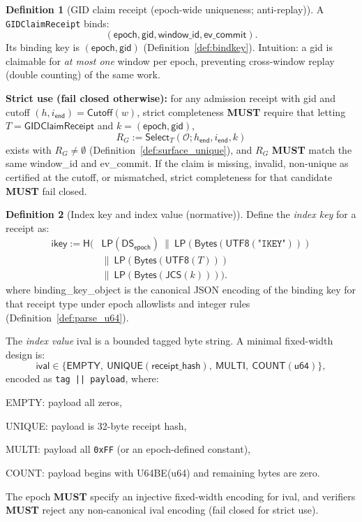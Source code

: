 \documentclass[11pt]{article}
\newcommand{\MUST}{\textbf{MUST}}
\newcommand{\code}[1]{\texttt{#1}}
\newcommand{\term}[1]{\emph{#1}}
\newcommand{\1}{\mathbf{1}}
\newcommand{\Hash}{\mathsf{H}}
\newcommand{\DS}{\mathsf{DS}}
\newcommand{\LP}{\mathsf{LP}}
\theoremstyle{definition}
\newtheorem{definition}{Definition}
\theoremstyle{plain}
\begin{document}
\begin{definition}[GID claim receipt (epoch-wide uniqueness; anti-replay)]
\label{def:gid_claim}
A \code{GIDClaimReceipt} binds:
\[
(\textsf{epoch},\textsf{gid},\textsf{window\_id},\textsf{ev\_commit}).
\]
Its binding key is $(\textsf{epoch},\textsf{gid})$ (Definition~\ref{def:bindkey}).
Intuition: a \textsf{gid} is claimable for \emph{at most one} window per epoch, preventing cross-window replay (double counting) of the same work.

\textbf{Strict use (fail closed otherwise):}
for any admission receipt with \textsf{gid} and cutoff $(h,i_{\textsf{end}})=\textsf{Cutoff}(w)$,
strict completeness \MUST{} require that letting $T=\textsf{GIDClaimReceipt}$ and $k=(\textsf{epoch},\textsf{gid})$,
\[
R_G := \mathsf{Select}_T(\mathcal{O};h_{\textsf{end}},i_{\textsf{end}},k)
\]
exists with $R_G\neq\emptyset$ (Definition~\ref{def:surface_unique}),
and $R_G$ \MUST{} match the same \textsf{window\_id} and \textsf{ev\_commit}.
If the claim is missing, invalid, non-unique as certified at the cutoff, or mismatched, strict completeness for that candidate \MUST{} fail closed.
\end{definition}



\begin{definition}[Index key and index value (normative)]
\label{def:index_kv}
Define the \term{index key} for a receipt as:
\begin{align*}
\textsf{ikey} := \Hash\!\Big(
  &\LP(\DS_{\textsf{epoch}})\ \|\ \LP(\mathsf{Bytes}(\textsf{UTF8}(\texttt{"IKEY"})))\\
  &\|\ \LP(\mathsf{Bytes}(\textsf{UTF8}(T)))\\
  &\|\ \LP(\mathsf{Bytes}(\textsf{JCS}(k)))
\Big).
\end{align*}
where \textsf{binding\_key\_object} is the canonical JSON encoding of the binding key for that receipt type under epoch allowlists and integer rules (Definition~\ref{def:parse_u64}).

The \term{index value} \textsf{ival} is a bounded tagged byte string. A minimal fixed-width design is:
\[
\textsf{ival} \in \{\textsf{EMPTY},\ \textsf{UNIQUE}(\textsf{receipt\_hash}),\ \textsf{MULTI},\ \textsf{COUNT}(\textsf{u64})\},
\]
encoded as \code{tag || payload}, where:
\begin{tightitemize}
\item \textsf{EMPTY}: payload all zeros,
\item \textsf{UNIQUE}: payload is 32-byte receipt hash,
\item \textsf{MULTI}: payload all \code{0xFF} (or an epoch-defined constant),
\item \textsf{COUNT}: payload begins with \textsf{U64BE}(\textsf{u64}) and remaining bytes are zero.
\end{tightitemize}
The epoch \MUST{} specify an injective fixed-width encoding for \textsf{ival}, and verifiers \MUST{} reject any non-canonical \textsf{ival} encoding (fail closed for strict use).
\end{definition}
\end{document}
